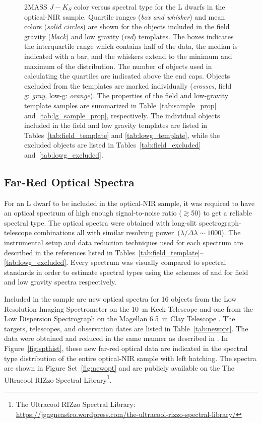 \documentclass[12pt]{aastex6}
\begin{document}
\begin{figure}
    \caption{2MASS $J-K_S$ color versus spectral type for the L dwarfs in the optical-NIR sample.
    Quartile ranges (\emph{box and whisker}) and mean colors (\emph{solid circles}) are shown for the objects included in the field gravity (\emph{black}) and low gravity (\emph{red}) templates. The boxes indicates the interquartile range which contains half of the data, the median is indicated with a bar, and the whiskers extend to the minimum and maximum of the distribution. The number of objects used in calculating the quartiles are indicated above the end caps.
    Objects excluded from the templates are marked individually (\emph{crosses}, field g: \emph{gray}, low-g: \emph{orange}).
    The properties of the field and low-gravity template samples are summarized in Table~\ref{tab:sample_prop} and~\ref{tab:lg_sample_prop}, respectively. The individual objects included in the field and low gravity templates are listed in Tables~\ref{tab:field_template} and \ref{tab:lowg_template}, while the excluded objects are listed in Tables~\ref{tab:field_excluded} and~\ref{tab:lowg_excluded}.}
  \label{fig:JK_colors}
\end{figure}

\subsection{Far-Red Optical Spectra}
\label{sec:obs_new_opt}

For an L dwarf to be included in the optical-NIR sample, it was required to have an optical spectrum of high enough signal-to-noise ratio ($\gtrsim$50) to get a reliable spectral type.
The optical spectra were obtained with long-slit spectrograph-telescope combinations all with similar resolving power~($\lambda/\Delta\lambda\sim1000$).
The instrumental setup and data reduction techniques used for each spectrum are described in the references listed in Tables~\ref{tab:field_template}--\ref{tab:lowg_excluded}.
Every spectrum was visually compared to spectral standards in order to estimate spectral types using the schemes of \citet{K99} and \cite{Cruz09_lowg} for field and low gravity spectra respectively.

Included in the sample are new optical spectra for 16 objects from the Low Resolution Imaging Spectrometer on the 10~m Keck Telescope \citep[LRIS]{LRIS} and one from the Low Dispersion Spectrograph on the Magellan 6.5~m Clay Telescope \citep[LDSS-3]{LDSS2}.
The targets, telescopes, and observation dates are listed in Table~\ref{tab:newopt}.
The data were obtained and reduced in the same manner as described in \citet{Kirkpatrick10}.
In Figure~\ref{fig:spthist}, these new far-red optical data are indicated in the spectral type distribution of the entire optical-NIR sample with left hatching.
The spectra are shown in Figure Set~\ref{fig:newopt} and are publicly available on the The Ultracool RIZzo Spectral Library\footnote{The Ultracool RIZzo Spectral Library: \url{https://jgagneastro.wordpress.com/the-ultracool-rizzo-spectral-library/}}.
\end{document}
